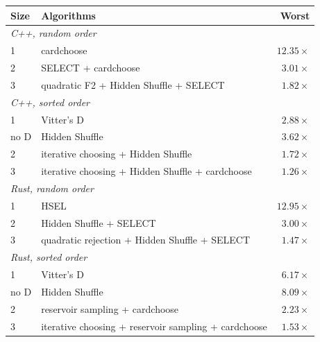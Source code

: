\begin{tabular}{ llr }
Size & Algorithms & Worst \\
\hline
\multicolumn{3}{l}{\emph{C++, random order}} \\
1 & cardchoose & \(12.35\times\) \\
2 & SELECT + cardchoose & \(3.01\times\) \\
3 & quadratic F2 + Hidden Shuffle + SELECT & \(1.82\times\) \\
\multicolumn{3}{l}{\emph{C++, sorted order}} \\
1 & Vitter's D & \(2.88\times\) \\
no D & Hidden Shuffle & \(3.62\times\) \\
2 & iterative choosing + Hidden Shuffle & \(1.72\times\) \\
3 & iterative choosing + Hidden Shuffle + cardchoose & \(1.26\times\) \\
\multicolumn{3}{l}{\emph{Rust, random order}} \\
1 & HSEL & \(12.95\times\) \\
2 & Hidden Shuffle + SELECT & \(3.00\times\) \\
3 & quadratic rejection + Hidden Shuffle + SELECT & \(1.47\times\) \\
\multicolumn{3}{l}{\emph{Rust, sorted order}} \\
1 & Vitter's D & \(6.17\times\) \\
no D & Hidden Shuffle & \(8.09\times\) \\
2 & reservoir sampling + cardchoose & \(2.23\times\) \\
3 & iterative choosing + reservoir sampling + cardchoose & \(1.53\times\) \\
\end{tabular}
